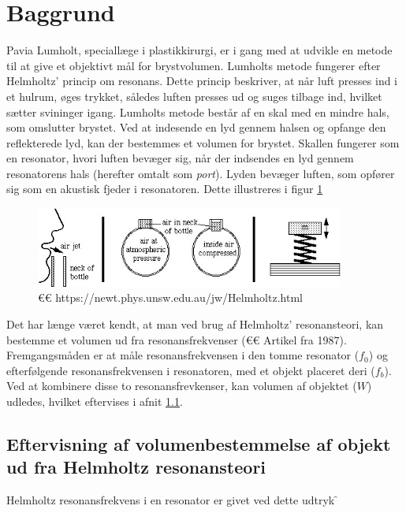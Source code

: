 \section{Baggrund}

Pavia Lumholt, speciallæge i plastikkirurgi, er i gang med at udvikle en metode til at give et objektivt mål for brystvolumen.  
Lumholts metode fungerer efter Helmholtz' princip om resonans. Dette princip beskriver, at når luft presses ind i et hulrum, øges trykket, således luften presses ud og suges tilbage ind, hvilket sætter svininger igang. 
Lumholts metode består af en skal med en mindre hals, som omslutter brystet. Ved at indesende en lyd gennem halsen og opfange den reflekterede lyd, kan der bestemmes et volumen for brystet.
 Skallen fungerer som en resonator, hvori luften bevæger sig, når der indsendes en lyd gennem resonatorens hals (herefter omtalt som \textit{port}). Lyden bevæger luften, som opfører sig som en akustisk fjeder i resonatoren. Dette illustreres i  figur \ref{fig:Helmholtzteori}

\begin{figure}[htb]
\centering
\includegraphics[width=4in]{Helmholtzresonans}
\caption{€€ https://newt.phys.unsw.edu.au/jw/Helmholtz.html}
\label{fig:Helmholtzteori}
\end{figure}

Det har længe været kendt, at man ved brug af Helmholtz' resonansteori, kan bestemme et volumen ud fra resonansfrekvenser (€€ Artikel fra 1987). Fremgangsmåden er at måle resonansfrekvensen i den tomme resonator ($f_{0}$) og efterfølgende resonansfrekvensen i resonatoren, med et objekt placeret deri ($f_{b}$). Ved at kombinere disse to resonansfrevkenser, kan volumen af objektet ($W$) udledes, hvilket eftervises i afnit \ref{subsec:efter}.\\ 
\subsection{Eftervisning af volumenbestemmelse af objekt ud fra Helmholtz resonansteori}
\label{subsec:efter}

 Helmholtz resonansfrekvens i en resonator er givet ved dette udtryk \f

